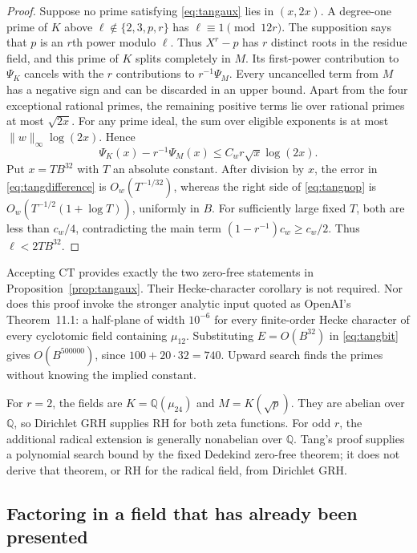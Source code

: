 \documentclass[11pt]{article}
\theoremstyle{definition}
\theoremstyle{remark}
\begin{document}
\begin{proof}
Suppose no prime satisfying \eqref{eq:tangaux} lies in $(x,2x)$.
A degree-one prime of $K$ above
$\ell\notin\{2,3,p,r\}$ has $\ell\equiv1\pmod{12r}$.
The supposition says that $p$ is an $r$th power modulo $\ell$.
Thus $X^r-p$ has $r$ distinct roots in the residue field, and this
prime of $K$ splits completely in $M$. Its first-power contribution
to $\Psi_K$ cancels with the $r$ contributions to $r^{-1}\Psi_M$.
Every uncancelled term from $M$ has a negative sign and can be
discarded in an upper bound. Apart from the four exceptional rational
primes, the remaining positive terms lie over rational primes at most
$\sqrt{2x}$. For any prime ideal, the sum over eligible exponents is
at most $\|w\|_\infty\log(2x)$. Hence
\begin{equation}\label{eq:tangnop}
 \Psi_K(x)-r^{-1}\Psi_M(x)
 \leq C_wr\sqrt{x}\log(2x).
\end{equation}
Put $x=TB^{32}$ with $T$ an absolute constant. After division by $x$,
the error in \eqref{eq:tangdifference} is $O_w(T^{-1/32})$, whereas
the right side of \eqref{eq:tangnop} is
$O_w(T^{-1/2}(1+\log T))$, uniformly in $B$. For sufficiently large
fixed $T$, both are less than $c_w/4$, contradicting the main term
$(1-r^{-1})c_w\geq c_w/2$. Thus $\ell<2TB^{32}$.
\end{proof}

Accepting \(\mathrm{CT}\) provides exactly the two zero-free
statements in Proposition~\ref{prop:tangaux}. Their Hecke-character
corollary is not required. Nor does this proof invoke the stronger
analytic input quoted as OpenAI's Theorem~11.1: a half-plane of width
$10^{-6}$ for every finite-order Hecke character of every cyclotomic
field containing $\mu_{12}$. Substituting $E=O(B^{32})$ in
\eqref{eq:tangbit} gives $O(B^{500000})$, since $100+20\cdot32=740$.
Upward search finds the primes without knowing the implied constant.

For $r=2$, the fields are
$K=\mathbb Q(\mu_{24})$ and $M=K(\sqrt p)$. They are abelian over
$\mathbb Q$, so Dirichlet GRH supplies RH for both zeta functions.
For odd $r$, the additional radical extension is generally nonabelian
over $\mathbb Q$. Tang's proof supplies a polynomial search bound by
the fixed Dedekind zero-free theorem; it does not derive that theorem,
or RH for the radical field, from Dirichlet GRH.

\subsection{Factoring in a field that has already been presented}
\end{document}
